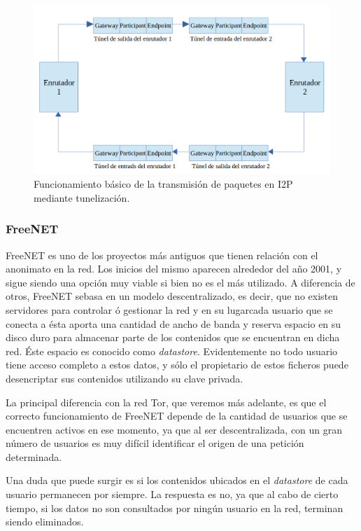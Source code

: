 	\begin{figure}[h]
		\centerline{
			\mbox{\includegraphics[width=5.00in]{images/tunnel_i2p.png}}
		}
		\caption{Funcionamiento básico de la transmisión de paquetes en I2P mediante tunelización.}
		\label{fig:norm_Daugman}
	\end{figure}



\subsubsection {FreeNET}

FreeNET es uno de los proyectos más antiguos que tienen relación con
el anonimato en la red. Los inicios del mismo aparecen alrededor del
año 2001, y sigue siendo una opción muy viable si bien no es el más
utilizado. A diferencia de otros, FreeNET sebasa en un modelo
descentralizado, es decir, que no existen servidores para controlar ó
gestionar la red y en su lugarcada usuario que se conecta a ésta
aporta una cantidad de ancho de banda y reserva espacio en su disco
duro para almacenar parte de los contenidos que se encuentran en dicha
red.  Éste espacio es conocido como \textit{datastore}. Evidentemente
no todo usuario tiene acceso completo a estos datos, y sólo el
propietario de estos ficheros puede desencriptar sus contenidos
utilizando su clave privada.

La principal diferencia con la red Tor, que veremos más adelante, es
que el correcto funcionamiento de FreeNET depende de la cantidad de
usuarios que se encuentren activos en ese momento, ya que al ser
descentralizada, con un gran número de usuarios es muy difícil
identificar el origen de una petición determinada.

Una duda que puede surgir es si los contenidos ubicados en el
\textit{datastore} de cada usuario permanecen por siempre. La
respuesta es no, ya que al cabo de cierto tiempo, si los datos no son
consultados por ningún usuario en la red, terminan siendo eliminados.

